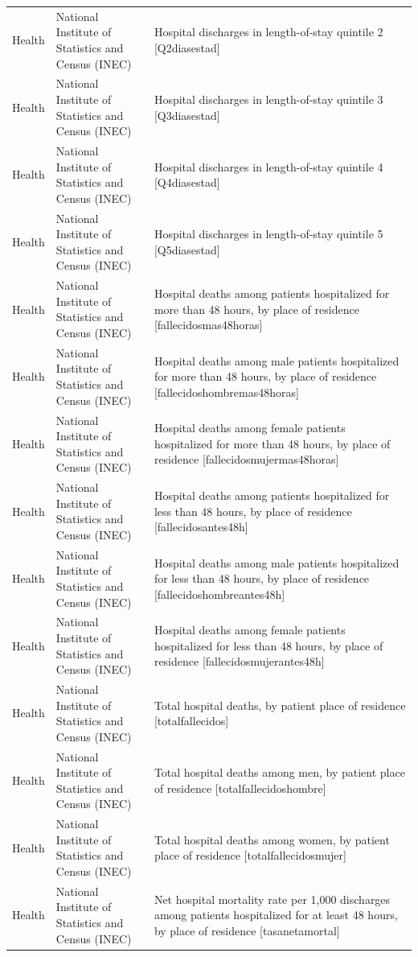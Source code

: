 \documentclass[10pt,a4paper]{article}
\begin{document}
\begin{longtable}{@{}>{\raggedright\arraybackslash}p{3.5cm}>{\raggedright\arraybackslash}p{5.6cm}>{\raggedright\arraybackslash}p{\dimexpr\textwidth-9.1cm-4\tabcolsep\relax}@{}}
Health & National Institute of Statistics and Census (INEC) & Hospital discharges in length-of-stay quintile 2 [Q2diasestad]\\
Health & National Institute of Statistics and Census (INEC) & Hospital discharges in length-of-stay quintile 3 [Q3diasestad]\\
Health & National Institute of Statistics and Census (INEC) & Hospital discharges in length-of-stay quintile 4 [Q4diasestad]\\
Health & National Institute of Statistics and Census (INEC) & Hospital discharges in length-of-stay quintile 5 [Q5diasestad]\\
Health & National Institute of Statistics and Census (INEC) & Hospital deaths among patients hospitalized for more than 48 hours, by place of residence [fallecidosmas48horas]\\
Health & National Institute of Statistics and Census (INEC) & Hospital deaths among male patients hospitalized for more than 48 hours, by place of residence [fallecidoshombremas48horas]\\
Health & National Institute of Statistics and Census (INEC) & Hospital deaths among female patients hospitalized for more than 48 hours, by place of residence [fallecidosmujermas48horas]\\
Health & National Institute of Statistics and Census (INEC) & Hospital deaths among patients hospitalized for less than 48 hours, by place of residence [fallecidosantes48h]\\
Health & National Institute of Statistics and Census (INEC) & Hospital deaths among male patients hospitalized for less than 48 hours, by place of residence [fallecidoshombreantes48h]\\
Health & National Institute of Statistics and Census (INEC) & Hospital deaths among female patients hospitalized for less than 48 hours, by place of residence [fallecidosmujerantes48h]\\
Health & National Institute of Statistics and Census (INEC) & Total hospital deaths, by patient place of residence [totalfallecidos]\\
Health & National Institute of Statistics and Census (INEC) & Total hospital deaths among men, by patient place of residence [totalfallecidoshombre]\\
Health & National Institute of Statistics and Census (INEC) & Total hospital deaths among women, by patient place of residence [totalfallecidosmujer]\\
Health & National Institute of Statistics and Census (INEC) & Net hospital mortality rate per 1,000 discharges among patients hospitalized for at least 48 hours, by place of residence [tasanetamortal]\\

\end{longtable}
\end{document}
